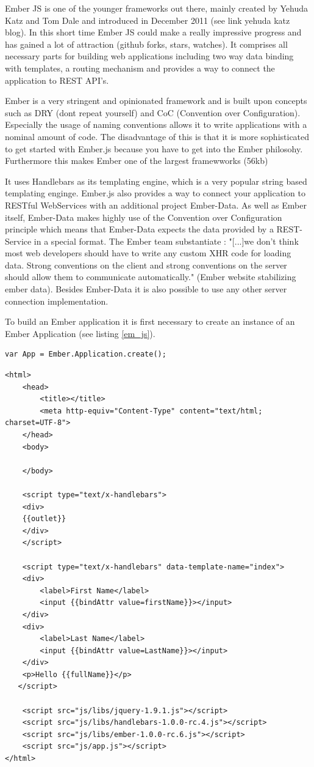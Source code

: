 Ember JS is one of the younger frameworks out there, mainly created by Yehuda Katz and Tom Dale and introduced in December 2011 (see link yehuda katz blog). In this short time Ember JS could make a really impressive progress and has gained a lot of attraction (github forks, stars, watches). It comprises all necessary parts for building web applications including two way data binding with templates, a routing mechanism and provides a way to connect the application to REST API's. 

Ember is a very stringent and opinionated framework and is built upon concepts such as DRY (dont repeat yourself) and CoC (Convention over Configuration). Especially the usage of naming conventions allows it to write applications with a nominal amount of code. The disadvantage of this is that it is more sophisticated to get started with Ember.js because you have to get into the Ember philosohy. %
Furthermore this makes Ember one of the largest framewworks (56kb)


It uses Handlebars as its templating engine, which is a very popular string based templating enginge. Ember.js also provides a way to connect your application to RESTful WebServices with an additional project Ember-Data. As well as Ember itself, Ember-Data makes highly use of the Convention over Configuration principle which means that Ember-Data expects the data provided by a REST-Service in a special format. The Ember team substantiate : "[...]we don't think most web developers should have to write any custom XHR code for loading data. Strong conventions on the client and strong conventions on the server should allow them to communicate automatically." (Ember website stabilizing ember data). Besides Ember-Data it is also possible to use any other server connection implementation.         


To build an Ember application it is first necessary to create an instance of an Ember Application (see listing \ref{em_js}).
\begin{lstlisting}[label=em_js, caption=app.js]
var App = Ember.Application.create();
\end{lstlisting}

\begin{lstlisting}[label=em_html,caption=index.html]
<html>
    <head>
        <title></title>
        <meta http-equiv="Content-Type" content="text/html; charset=UTF-8">
    </head>
    <body>

    </body>
    
    <script type="text/x-handlebars">
	<div>
	{{outlet}}
	</div>
    </script>

    <script type="text/x-handlebars" data-template-name="index">
	<div>
		<label>First Name</label> 
		<input {{bindAttr value=firstName}}></input>
	</div>
	<div>
		<label>Last Name</label> 
		<input {{bindAttr value=LastName}}></input>
	</div>
	<p>Hello {{fullName}}</p>
   </script>

    <script src="js/libs/jquery-1.9.1.js"></script>
    <script src="js/libs/handlebars-1.0.0-rc.4.js"></script>
    <script src="js/libs/ember-1.0.0-rc.6.js"></script>
    <script src="js/app.js"></script>
</html>
\end{lstlisting}

